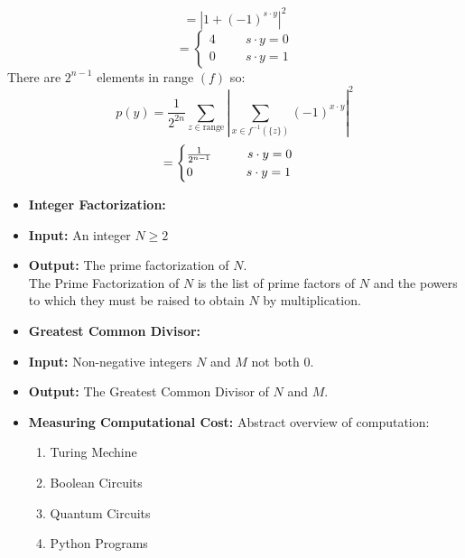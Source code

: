 \documentclass[12pt]{beamer}
\begin{document}
\begin{frame}
\[
= \left| 1 + (-1)^{s \cdot y} \right|^2
\]
\[
=
\begin{cases}
    4 \hspace{1cm} s \cdot y = 0 \\
    0 \hspace{1cm} s \cdot y = 1
\end{cases}
\]
There are \(2^{n-1}\) elements in range \((f)\) so:
\[
p(y) = \frac{1}{2^{2n}}\sum_{z\in\text{range}} \left| \sum_{x\in f^{-1}(\{z\})} (-1)^{x \cdot y} \right|^2
\]
\[
=
\begin{cases}
    \frac{1}{2^{n-1}} \hspace{1cm} s \cdot y = 0 \\
    0  \hspace{1.5cm} s \cdot y = 1
\end{cases}
\]
\end{frame}
\begin{frame}
\begin{itemize}
\item\textbf{Integer Factorization:}
\item \textbf{Input:}
An integer \(N \geq 2\)
\item \textbf{Output:}
The prime factorization of \(N\).\\
The Prime Factorization of \(N\) is the list of prime factors of \(N\) and the powers to which they must be raised to obtain \(N\) by multiplication.
\item\textbf{Greatest Common Divisor:}
\item \textbf{Input:} Non-negative integers \(N\) and \(M\) not both 0.
\item \textbf{Output:} The Greatest Common Divisor of \(N\) and \(M\).
\item\textbf{Measuring Computational Cost:}
Abstract overview of computation: \\
\begin{enumerate}
\item{Turing Mechine}
\item{Boolean Circuits}
\item{Quantum Circuits}
\item{Python Programs}
\end{enumerate}
\end{itemize}
\end{frame}
\end{document}
